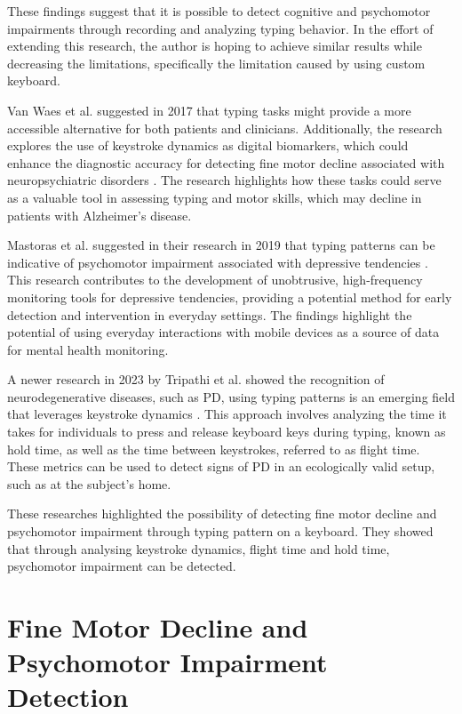 These findings suggest that it is possible to detect cognitive and psychomotor impairments through recording and analyzing typing behavior.
In the effort of extending this research, the author is hoping to achieve similar results while decreasing the limitations, specifically the limitation caused by using custom keyboard.

Van Waes et al. suggested in 2017 that typing tasks might provide a more accessible alternative for both patients and clinicians. 
Additionally, the research explores the use of keystroke dynamics as digital biomarkers, which could enhance the diagnostic accuracy for detecting fine motor decline associated with neuropsychiatric disorders \cite{VanWaes2017}. 
The research highlights how these tasks could serve as a valuable tool in assessing typing and motor skills, which may decline in patients with Alzheimer's disease.

Mastoras et al. suggested in their research in 2019  that typing patterns can be indicative of psychomotor impairment associated with depressive tendencies \cite{Mastoras2019}. 
This research contributes to the development of unobtrusive, high-frequency monitoring tools for depressive tendencies, providing a potential method for early detection and intervention in everyday settings. 
The findings highlight the potential of using everyday interactions with mobile devices as a source of data for mental health monitoring.

A newer research in 2023 by Tripathi et al. showed the recognition of neurodegenerative diseases, such as \ac{PD}, using typing patterns is an emerging field that leverages keystroke dynamics \cite{Tripathi2023}. 
This approach involves analyzing the time it takes for individuals to press and release keyboard keys during typing, known as hold time, as well as the time between keystrokes, referred to as flight time. 
These metrics can be used to detect signs of \ac{PD} in an ecologically valid setup, such as at the subject's home.

These researches highlighted the possibility of detecting fine motor decline and psychomotor impairment through typing pattern on a keyboard. 
They showed that through analysing keystroke dynamics, flight time and hold time, psychomotor impairment can be detected. 

\section{Fine Motor Decline and Psychomotor Impairment Detection}

